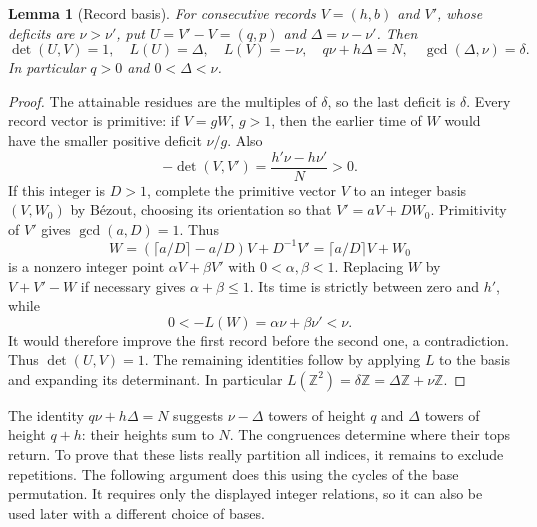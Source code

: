 \documentclass[11pt,a4paper]{article}
\newcommand{\Z}{\mathbb Z}
\newtheorem{lemma}[theorem]{Lemma}
\theoremstyle{definition}
\theoremstyle{remark}
\numberwithin{equation}{section}
\begin{document}
\begin{lemma}[Record basis]\label{lem:record-basis}
For consecutive records $V=(h,b)$ and $V'$, whose deficits are $\nu>\nu'$, put $U=V'-V=(q,p)$ and $\Delta=\nu-\nu'$. Then
\begin{equation}\label{eq:record-basis}
 \det(U,V)=1,\quad L(U)=\Delta,\quad L(V)=-\nu,
 \quad q\nu+h\Delta=N,\quad \gcd(\Delta,\nu)=\delta.
\end{equation}
In particular $q>0$ and $0<\Delta<\nu$.
\end{lemma}
\begin{proof}
The attainable residues are the multiples of $\delta$, so the last deficit is $\delta$. Every record vector is primitive: if $V=gW$, $g>1$, then the earlier time of $W$ would have the smaller positive deficit $\nu/g$. Also
\[
 -\det(V,V')=\frac{h'\nu-h\nu'}{N}>0.
\]
If this integer is $D>1$, complete the primitive vector $V$ to an integer basis $(V,W_0)$ by B\'ezout, choosing its orientation so that $V'=aV+DW_0$. Primitivity of $V'$ gives $\gcd(a,D)=1$. Thus
\[
 W=\left(\lceil a/D\rceil-a/D\right)V+D^{-1}V'
   =\lceil a/D\rceil V+W_0
\]
is a nonzero integer point $\alpha V+\beta V'$ with $0<\alpha,\beta<1$. Replacing $W$ by $V+V'-W$ if necessary gives $\alpha+\beta\le1$. Its time is strictly between zero and $h'$, while
\[
 0<-L(W)=\alpha\nu+\beta\nu'<\nu.
\]
It would therefore improve the first record before the second one, a contradiction. Thus $\det(U,V)=1$. The remaining identities follow by applying $L$ to the basis and expanding its determinant. In particular $L(\Z^2)=\delta\Z=\Delta\Z+\nu\Z$.
\end{proof}

The identity $q\nu+h\Delta=N$ suggests $\nu-\Delta$ towers of height
$q$ and $\Delta$ towers of height $q+h$: their heights sum to $N$.
The congruences determine where their tops return. To prove that these
lists really partition all indices, it remains to exclude repetitions.
The following argument does this using the cycles of the base
permutation. It requires only the displayed integer relations, so it
can also be used later with a different choice of bases.
\end{document}
